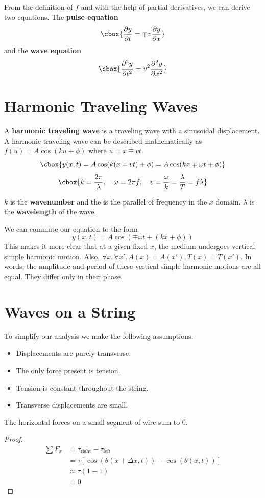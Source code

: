\documentclass{hw}
\renewcommand\emph[1]{{\bf\color{BlueViolet}#1}}
\begin{document}
From the definition of $f$ and with the help of partial derivatives, we can
derive two equations. The \emph{pulse equation}
\[\cbox{
  \frac{\partial y}{\partial t} = \mp v \frac{\partial y}{\partial x}
}\]
and the \emph{wave equation}
\[\cbox{ 
  \frac{\partial^2 y}{\partial t^2} = v^2 \frac{\partial^2 y}{\partial x^2}
}\]

\section{Harmonic Traveling Waves}
A \emph{harmonic traveling wave} is a traveling wave with a sinusoidal
displacement. A harmonic traveling wave can be described mathematically as
$f(u) = A\cos(ku + \phi)$ where $u = x \mp vt$.
\[\cbox{
  y(x,t) = A\cos(k(x \mp vt) + \phi) = A\cos(kx \mp \omega t + \phi)
}\]
\[\cbox{
  k = \frac{2\pi}{\lambda}, \quad 
  \omega = 2 \pi f, \quad
  v = \frac{\omega}{k} = \frac{\lambda}{T} = f \lambda
}\]

$k$ is the \emph{wavenumber} and the is the parallel of frequency in the $x$
domain. $\lambda$ is the \emph{wavelength} of the wave.

We can commute our equation to the form
\[
  y(x,t) = A\cos(\mp \omega t + (kx + \phi))
\]
This makes it more clear that at a given fixed $x$, the medium undergoes
vertical simple harmonic motion. Also, $\forall x.\, \forall x'.\, A(x) =
A(x'), T(x) = T(x')$. In words, the amplitude and period of these vertical
simple harmonic motions are all equal. They differ only in their phase.

\section{Waves on a String}
To simplify our analysis we make the following assumptions.
\begin{itemize}
  \item Displacements are purely transverse.
  \item The only force present is tension.
  \item Tension is constant throughout the string.
  \item Transverse displacements are small.
\end{itemize}

\begin{claim}
The horizontal forces on a small segment of wire sum to 0.
\begin{proof}
\begin{align*}
  \sum F_x &= \tau_{\text{right}} - \tau_{\text{left}} \\
           &= \tau\left[\cos(\theta(x + \Delta x, t)) - \cos(\theta(x, t)) \right] \\
           &\approx \tau (1 - 1) \\
           &= 0
\end{align*}
\end{proof}
\end{claim}
\end{document}
